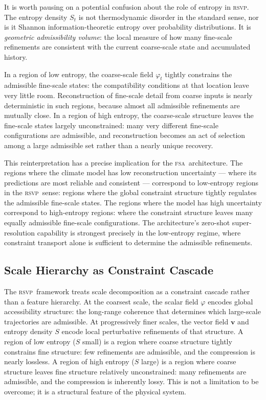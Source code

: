 \documentclass[11pt,a4paper]{article}
\theoremstyle{plain}
\theoremstyle{definition}
\theoremstyle{remark}
\newcommand{\RSVP}{\textup{\textsc{rsvp}}}
\newcommand{\FSA}{\textup{\textsc{fsa}}}
\begin{document}
It is worth pausing on a potential confusion about the role of entropy in
\RSVP. The entropy density $S_t$ is not thermodynamic disorder in the
standard sense, nor is it Shannon information-theoretic entropy over
probability distributions. It is \textit{geometric admissibility volume}:
the local measure of how many fine-scale refinements are consistent with
the current coarse-scale state and accumulated history.

In a region of low entropy, the coarse-scale field $\varphi_t$ tightly
constrains the admissible fine-scale states: the compatibility conditions
at that location leave very little room. Reconstruction of fine-scale
detail from coarse inputs is nearly deterministic in such regions, because
almost all admissible refinements are mutually close. In a region of high
entropy, the coarse-scale structure leaves the fine-scale states largely
unconstrained: many very different fine-scale configurations are admissible,
and reconstruction becomes an act of selection among a large admissible
set rather than a nearly unique recovery.

This reinterpretation has a precise implication for the \FSA\ architecture.
The regions where the climate model has low reconstruction uncertainty ---
where its predictions are most reliable and consistent --- correspond to
low-entropy regions in the \RSVP\ sense: regions where the global constraint
structure tightly regulates the admissible fine-scale states. The regions
where the model has high uncertainty correspond to high-entropy regions:
where the constraint structure leaves many equally admissible fine-scale
configurations. The architecture's zero-shot super-resolution capability is
strongest precisely in the low-entropy regime, where constraint transport
alone is sufficient to determine the admissible refinements.

\subsection{Scale Hierarchy as Constraint Cascade}

The \RSVP\ framework treats scale decomposition as a constraint cascade
rather than a feature hierarchy. At the coarsest scale, the scalar field
$\varphi$ encodes global accessibility structure: the long-range coherence
that determines which large-scale trajectories are admissible. At
progressively finer scales, the vector field $\mathbf{v}$ and entropy
density $S$ encode local perturbative refinements of that structure. A
region of low entropy ($S$ small) is a region where coarse structure
tightly constrains fine structure: few refinements are admissible, and the
compression is nearly lossless. A region of high entropy ($S$ large) is a
region where coarse structure leaves fine structure relatively unconstrained:
many refinements are admissible, and the compression is inherently lossy.
This is not a limitation to be overcome; it is a structural feature of the
physical system.
\end{document}

